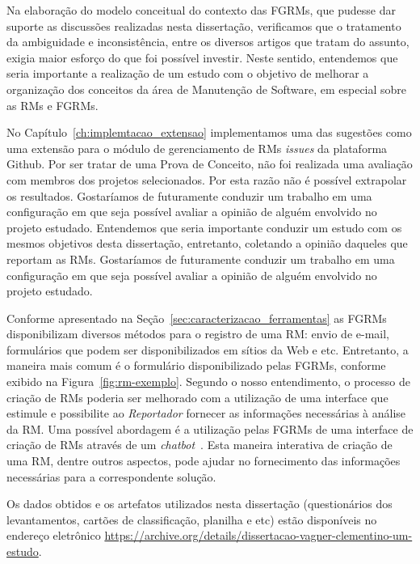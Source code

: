 Na elaboração do modelo conceitual do contexto das FGRMs, que pudesse dar
suporte as discussões realizadas nesta dissertação, verificamos que o
tratamento da ambiguidade e inconsistência, entre os diversos artigos que
tratam do assunto, exigia maior esforço do que foi possível investir. Neste
sentido, entendemos que seria importante a realização de um estudo com o
objetivo de melhorar a organização dos conceitos da área de Manutenção de
Software, em especial sobre as RMs e FGRMs.

No Capítulo~\ref{ch:implemtacao_extensao} implementamos uma das sugestões como
uma extensão para o módulo de gerenciamento de RMs \textit{issues} da
plataforma Github. Por ser tratar de uma Prova de Conceito, não foi realizada
uma avaliação com membros dos projetos selecionados. Por esta razão não é
possível extrapolar os resultados.  Gostaríamos de futuramente conduzir um
trabalho em uma configuração em que seja possível avaliar a opinião de alguém
envolvido no projeto estudado. Entendemos que seria importante conduzir um
estudo com os mesmos objetivos desta dissertação, entretanto, coletando a
opinião daqueles que reportam as RMs.  Gostaríamos de futuramente conduzir um
trabalho em uma configuração em que seja possível avaliar a opinião de alguém
envolvido no projeto estudado.

Conforme apresentado na Seção~\ref{sec:caracterizacao_ferramentas} as FGRMs
disponibilizam diversos métodos para o registro de uma RM\@: envio de e-mail,
formulários que podem ser disponibilizados em sítios da Web e etc. Entretanto,
a maneira mais comum é o formulário disponibilizado pelas FGRMs, conforme
exibido na Figura~\ref{fig:rm-exemplo}. Segundo o nosso entendimento, o
processo de criação de RMs poderia ser melhorado com a utilização de uma
interface que estimule e possibilite ao \textit{Reportador} fornecer as
informações necessárias à análise da RM. Uma possível abordagem é a utilização
pelas FGRMs de uma interface de criação de RMs através de um
\textit{chatbot}~\cite{mauldin1994chatterbots,huang2007extracting}. Esta
maneira interativa de criação de uma RM, dentre outros aspectos, pode ajudar no
fornecimento das informações necessárias para a correspondente solução.

Os dados obtidos e os artefatos utilizados nesta dissertação (questionários dos
levantamentos, cartões de classificação, planilha e etc) estão disponíveis no
endereço eletrônico
\url{https://archive.org/details/dissertacao-vagner-clementino-um-estudo}.
